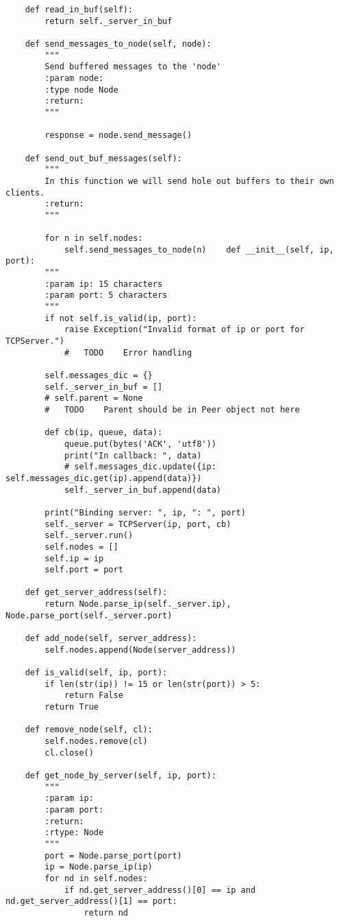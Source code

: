 \documentclass{article}
\begin{document}
\begin{lstlisting}
    def read_in_buf(self):
        return self._server_in_buf

    def send_messages_to_node(self, node):
        """
        Send buffered messages to the 'node'
        :param node:
        :type node Node
        :return:
        """

        response = node.send_message()

    def send_out_buf_messages(self):
        """
        In this function we will send hole out buffers to their own clients.
        :return:
        """

        for n in self.nodes:
            self.send_messages_to_node(n)    def __init__(self, ip, port):
        """
        :param ip: 15 characters
        :param port: 5 characters
        """
        if not self.is_valid(ip, port):
            raise Exception("Invalid format of ip or port for TCPServer.")
            #   TODO    Error handling

        self.messages_dic = {}
        self._server_in_buf = []
        # self.parent = None
        #   TODO    Parent should be in Peer object not here

        def cb(ip, queue, data):
            queue.put(bytes('ACK', 'utf8'))
            print("In callback: ", data)
            # self.messages_dic.update({ip: self.messages_dic.get(ip).append(data)})
            self._server_in_buf.append(data)

        print("Binding server: ", ip, ": ", port)
        self._server = TCPServer(ip, port, cb)
        self._server.run()
        self.nodes = []
        self.ip = ip
        self.port = port

    def get_server_address(self):
        return Node.parse_ip(self._server.ip), Node.parse_port(self._server.port)

    def add_node(self, server_address):
        self.nodes.append(Node(server_address))

    def is_valid(self, ip, port):
        if len(str(ip)) != 15 or len(str(port)) > 5:
            return False
        return True

    def remove_node(self, cl):
        self.nodes.remove(cl)
        cl.close()

    def get_node_by_server(self, ip, port):
        """
        :param ip:
        :param port:
        :return:
        :rtype: Node
        """
        port = Node.parse_port(port)
        ip = Node.parse_ip(ip)
        for nd in self.nodes:
            if nd.get_server_address()[0] == ip and nd.get_server_address()[1] == port:
                return nd


\end{lstlisting}
\end{document}
